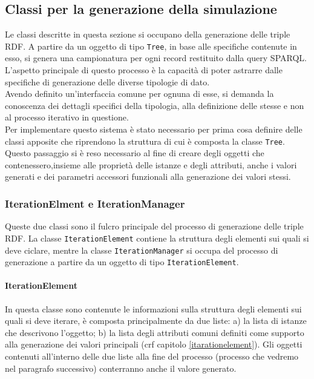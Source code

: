 \documentclass[12pt,a4paper,italian]{article}
\begin{document}
	\subsection{Classi per la generazione della simulazione}
	Le classi descritte in questa sezione si occupano della generazione delle triple RDF. A partire da un oggetto di tipo \texttt{Tree}, in base alle specifiche contenute in esso, si genera una campionatura per ogni record restituito dalla query SPARQL.\\
	L'aspetto principale di questo processo è la capacità di poter astrarre dalle specifiche di generazione delle diverse tipologie di dato.\\ Avendo definito un'interfaccia comune per 	ognuna di esse, si demanda la conoscenza dei dettagli specifici della tipologia, alla definizione delle stesse e non al processo iterativo in questione.\\
	Per implementare questo sistema è stato necessario per prima cosa definire delle classi apposite che riprendono la struttura di cui è composta la classe \texttt{Tree}. Questo passaggio si è reso necessario al fine di creare degli oggetti che contenessero,insieme alle proprietà delle istanze e degli attributi, anche i valori generati e dei parametri accessori funzionali alla generazione dei valori stessi.
	
	\subsubsection{IterationElment e IterationManager}
	Queste due classi sono il fulcro principale del processo di generazione delle triple RDF. La classe \texttt{IterationElement} contiene la struttura degli elementi sui quali si deve ciclare, mentre la classe \texttt{IterationManager} si occupa del processo di generazione a partire da un oggetto di tipo \texttt{IterationElement}.
	
	\paragraph{IterationElement}

	In questa classe sono contenute le informazioni sulla struttura degli elementi sui quali si deve iterare, è composta principalmente da due liste: a) la lista di istanze che descrivono l'oggetto; b) la lista degli attributi comuni definiti come supporto alla generazione dei valori principali (crf capitolo \ref{itarationelement}).
	Gli oggetti contenuti all'interno delle due liste alla fine del processo (processo che vedremo nel paragrafo successivo) conterranno anche il valore generato. 
	
\end{document}
